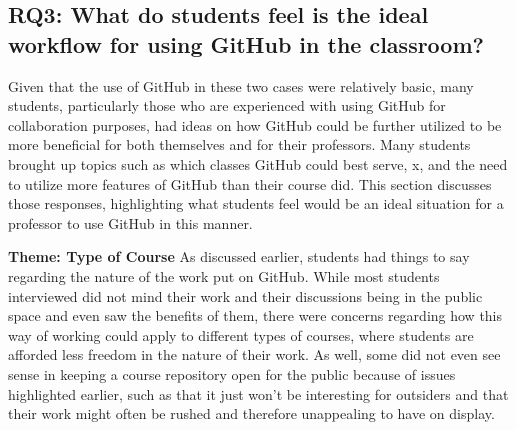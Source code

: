 




\subsection{RQ3: What do students feel is the ideal workflow for using GitHub in the classroom?}

Given that the use of GitHub in these two cases were relatively basic, many students, particularly those who are experienced with using GitHub for collaboration purposes, had ideas on how GitHub could be further utilized to be more beneficial for both themselves and for their professors. Many students brought up topics such as which classes GitHub could best serve, x, and the need to utilize more features of GitHub than their course did. This section discusses those responses, highlighting what students feel would be an ideal situation for a professor to use GitHub in this manner.

\textbf{Theme: Type of Course} \break
As discussed earlier, students had things to say regarding the nature of the work put on GitHub. While most students interviewed did not mind their work and their discussions being in the public space and even saw the benefits of them, there were concerns regarding how this way of working could apply to different types of courses, where students are afforded less freedom in the nature of their work. As well, some did not even see sense in keeping a course repository open for the public because of issues highlighted earlier, such as that it just won't be interesting for outsiders and that their work might often be rushed and therefore unappealing to have on display.

